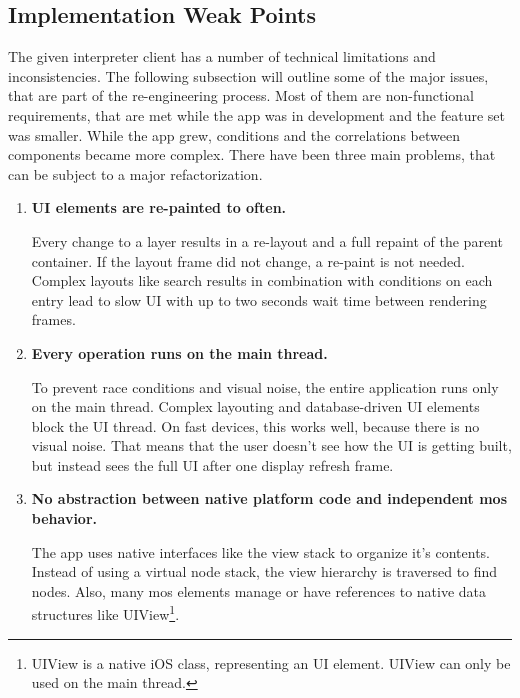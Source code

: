 \subsection{Implementation Weak Points}
\label{sec:implementationweakpoints}

The given interpreter client has a number of technical limitations and inconsistencies.
The following subsection will outline some of the major issues, that are part of the re-engineering process.
Most of them are non-functional requirements, that are met while the app was in development and the feature set was smaller.
While the app grew, conditions and the correlations between components became more complex.
There have been three main problems, that can be subject to a major refactorization.


\begin{enumerate}
	
	\item \textbf{\ac{UI} elements are re-painted to often.}
	
	Every change to a layer results in a re-layout and a full repaint of the parent container.
	If the layout frame did not change, a re-paint is not needed.
	Complex layouts like search results in combination with conditions on each entry lead to slow \ac{UI} with up to two seconds wait time between rendering frames.
	
	\item \textbf{Every operation runs on the main thread.}
	
	To prevent race conditions and visual noise, the entire application runs only on the main thread.
	Complex layouting and database-driven \ac{UI} elements block the UI thread.
	On fast devices, this works well, because there is no visual noise.
	That means that the user doesn't see how the \ac{UI} is getting built, but instead sees the full \ac{UI} after one display refresh frame.
	
	\item \textbf{No abstraction between native platform code and independent \ac{mos} behavior.}
	
	The app uses native interfaces like the view stack to organize it's contents.
	Instead of using a virtual node stack, the view hierarchy is traversed to find nodes.
	Also, many mos elements manage or have references to native data structures like UIView\footnote{UIView is a native iOS class, representing an UI element. UIView can only be used on the main thread.}.
	
\end{enumerate}

